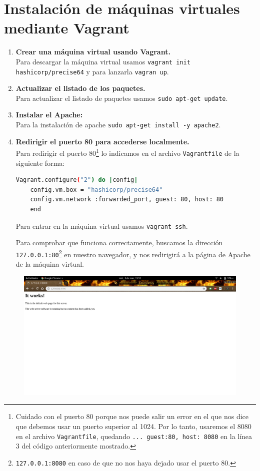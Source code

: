 \documentclass[12pt,letterpaper]{article}
\begin{document}
\section{Instalación de máquinas virtuales mediante Vagrant}
\begin{enumerate}
	\item \textbf{Crear una máquina virtual usando Vagrant.} \\
	Para descargar la máquina virtual usamos \texttt{vagrant init hashicorp/precise64} y para lanzarla \texttt{vagran up}.
	\item \textbf{Actualizar el listado de los paquetes.} \\
	Para actualizar el listado de paquetes usamos \texttt{sudo apt-get update}.
	\item \textbf{Instalar el Apache:} \\
	Para la instalación de apache \texttt{sudo apt-get install -y apache2}.
	\item \textbf{Redirigir el puerto 80 para accederse localmente.} \\
	Para redirigir el puerto 80\footnote{Cuidado con el puerto 80 porque nos puede salir un error en el que nos dice que debemos usar un puerto superior al 1024. Por lo tanto, usaremos el 8080 en el archivo \texttt{Vagrantfile}, quedando \texttt{... guest:80, host: 8080} en la línea 3 del código anteriormente mostrado.} lo indicamos en el archivo \texttt{Vagrantfile} de la siguiente forma:
	\begin{lstlisting}[language=Bash]
	Vagrant.configure("2") do |config|
	config.vm.box = "hashicorp/precise64"
	config.vm.network :forwarded_port, guest: 80, host: 80
	end
	\end{lstlisting}
	
	Para entrar en la máquina virtual usamos \texttt{vagrant ssh}.
	
	Para comprobar que funciona correctamente, buscamos la dirección \texttt{127.0.0.1:80}\footnote{\texttt{127.0.0.1:8080} en caso de que no nos haya dejado usar el puerto 80.} en nuestro navegador, y nos redirigirá a la página de Apache de la máquina virtual.
		
\end{enumerate}

\begin{figure}[h]
	\centering
	\includegraphics[scale=0.34]{apache.png}
\end{figure}
\end{document}
